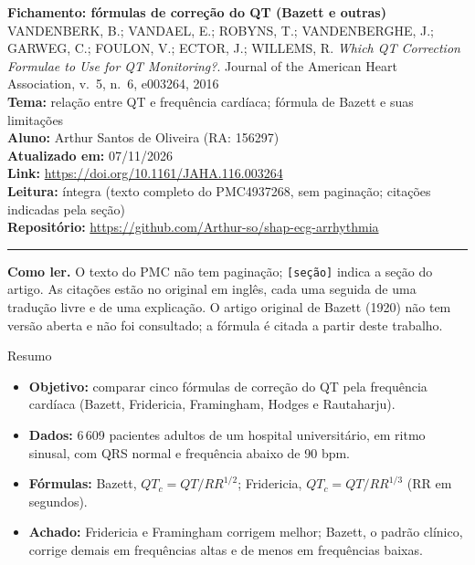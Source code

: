 \documentclass[11pt,a4paper]{article}
\begin{document}
\begin{center}
    {\LARGE \textbf{Fichamento: fórmulas de correção do QT (Bazett e outras)}} \\[0.35em]
    {\large VANDENBERK, B.; VANDAEL, E.; ROBYNS, T.; VANDENBERGHE, J.; GARWEG, C.; FOULON, V.; ECTOR, J.; WILLEMS, R. \textit{Which QT Correction Formulae to Use for QT Monitoring?}. Journal of the American Heart Association, v.~5, n.~6, e003264, 2016} \\[0.3em]
    \textbf{Tema:} relação entre QT e frequência cardíaca; fórmula de Bazett e suas limitações \\[0.2em]
    \textbf{Aluno:} Arthur Santos de Oliveira (RA: 156297) \\[0.2em]
    \textbf{Atualizado em:} 07/11/2026 \\[0.2em]
    \textbf{Link:} \url{https://doi.org/10.1161/JAHA.116.003264} \\[0.2em]
    \textbf{Leitura:} íntegra (texto completo do PMC4937268, sem paginação; citações indicadas pela seção) \\[0.2em]
    \textbf{Repositório:} \url{https://github.com/Arthur-so/shap-ecg-arrhythmia}
\end{center}
\vspace{-0.5em}
\hrule
\vspace{0.8em}

\textbf{Como ler.} O texto do PMC não tem paginação; \texttt{[seção]} indica a seção do artigo. As citações estão no original em inglês, cada uma seguida de uma tradução livre e de uma explicação. O artigo original de Bazett (1920) não tem versão aberta e não foi consultado; a fórmula é citada a partir deste trabalho.

\begin{infobox}[note]{Resumo}
\begin{itemize}
\item \textbf{Objetivo:} comparar cinco fórmulas de correção do QT pela frequência cardíaca (Bazett, Fridericia, Framingham, Hodges e Rautaharju).
\item \textbf{Dados:} 6\,609 pacientes adultos de um hospital universitário, em ritmo sinusal, com QRS normal e frequência abaixo de 90 bpm.
\item \textbf{Fórmulas:} Bazett, $QT_c = QT/RR^{1/2}$; Fridericia, $QT_c = QT/RR^{1/3}$ (RR em segundos).
\item \textbf{Achado:} Fridericia e Framingham corrigem melhor; Bazett, o padrão clínico, corrige demais em frequências altas e de menos em frequências baixas.
\end{itemize}
\end{infobox}
\end{document}
